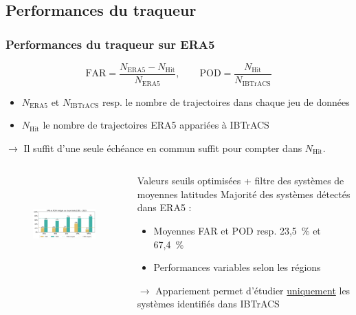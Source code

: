 \documentclass[aspectratio=169, usepdftitle=false, xcolor={dvipsnames}, 9pt,table]{beamer}
\begin{document}
\subsection*{Performances du traqueur}
\begin{frame}[t]
    \frametitle{Performances du traqueur sur ERA5}
    \footnotesize
    \begin{examples}    
        \scriptsize
        \[ \text{FAR} = \frac{N_{\text{ERA5}} - N_{\text{Hit}}}{N_{\text{ERA5}}}, \quad\quad \text{POD} = \frac{N_{\text{Hit}}}{N_{\text{IBTrACS}}} \]
        \setlength{\leftmargini}{2.5ex}
        \begin{itemize}
            \item $N_{\text{ERA5}}$ et $N_{\text{IBTrACS}}$ resp. le nombre de trajectoires dans chaque jeu de données
            \item $N_{\text{Hit}}$ le nombre de trajectoires ERA5 appariées à IBTrACS
        \end{itemize}
        $\longrightarrow$ Il suffit \alert{d'une seule échéance} en commun suffit pour compter dans $N_{\text{Hit}}$.
    \end{examples}
    \pause
    \begin{columns}
        \begin{column}{0.56\textwidth}
        \footnotesize
        \vspace{-1.5em}
        \begin{figure}
            \centering
            \includegraphics[height=3.8cm]{Figures/far_pod.png}
        \end{figure}
        \end{column}
        \begin{column}{0.36\linewidth}
        \scriptsize
        \vspace{-1em}
        \begin{block}        
            Valeurs seuils optimisées + filtre des systèmes de moyennes latitudes \parencite{hart_cyclone_2003}
            \tcblower
            \setlength{\leftmargini}{2.5ex}
            \alert{Majorité} des systèmes détectés dans ERA5 :
            \begin{itemize}
                \item Moyennes FAR et POD resp. 23,5~\% et 67,4~\%
                \item Performances variables selon les régions
            \end{itemize}
            $\longrightarrow$ Appariement permet d'étudier \underline{uniquement} les \alert{\mbox{systèmes} identifiés} dans IBTrACS
        \end{block}
        \end{column}
    \end{columns}
\end{frame}
\end{document}
